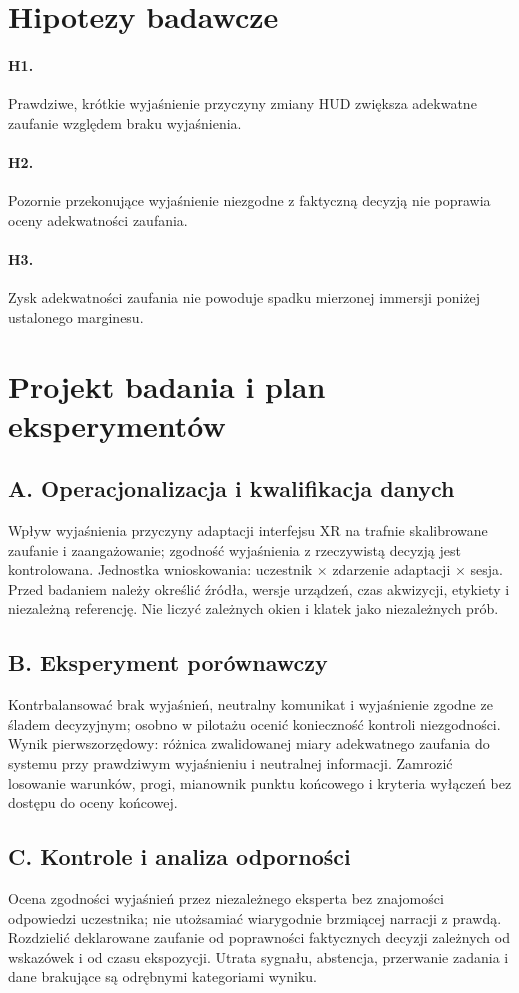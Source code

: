 \documentclass[11pt,a4paper]{article}
\begin{document}
\section{Hipotezy badawcze}
\paragraph{H1.} Prawdziwe, krótkie wyjaśnienie przyczyny zmiany HUD zwiększa adekwatne zaufanie względem braku wyjaśnienia.
\paragraph{H2.} Pozornie przekonujące wyjaśnienie niezgodne z faktyczną decyzją nie poprawia oceny adekwatności zaufania.
\paragraph{H3.} Zysk adekwatności zaufania nie powoduje spadku mierzonej immersji poniżej ustalonego marginesu.
\section{Projekt badania i plan eksperymentów}
\subsection{A. Operacjonalizacja i kwalifikacja danych}
Wpływ wyjaśnienia przyczyny adaptacji interfejsu XR na trafnie skalibrowane zaufanie i zaangażowanie; zgodność wyjaśnienia z rzeczywistą decyzją jest kontrolowana. Jednostka wnioskowania: uczestnik × zdarzenie adaptacji × sesja. Przed badaniem należy określić źródła, wersje urządzeń, czas akwizycji, etykiety i niezależną referencję. Nie liczyć zależnych okien i klatek jako niezależnych prób.
\subsection{B. Eksperyment porównawczy}
Kontrbalansować brak wyjaśnień, neutralny komunikat i wyjaśnienie zgodne ze śladem decyzyjnym; osobno w pilotażu ocenić konieczność kontroli niezgodności. Wynik pierwszorzędowy: różnica zwalidowanej miary adekwatnego zaufania do systemu przy prawdziwym wyjaśnieniu i neutralnej informacji. Zamrozić losowanie warunków, progi, mianownik punktu końcowego i kryteria wyłączeń bez dostępu do oceny końcowej.
\subsection{C. Kontrole i analiza odporności}
Ocena zgodności wyjaśnień przez niezależnego eksperta bez znajomości odpowiedzi uczestnika; nie utożsamiać wiarygodnie brzmiącej narracji z prawdą. Rozdzielić deklarowane zaufanie od poprawności faktycznych decyzji zależnych od wskazówek i od czasu ekspozycji. Utrata sygnału, abstencja, przerwanie zadania i dane brakujące są odrębnymi kategoriami wyniku.
\end{document}
